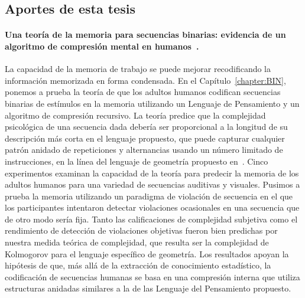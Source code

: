 \subsection{Aportes de esta tesis}

\paragraph{Una teoría de la memoria para secuencias binarias: evidencia de un algoritmo de compresión mental en humanos~\cite{planton2021memory}.} 
La capacidad de la memoria de trabajo se puede mejorar recodificando la información memorizada en forma condensada. En el Capítulo~\ref{chapter:BIN}, ponemos a prueba la teoría de que los adultos humanos codifican secuencias binarias de estímulos en la memoria utilizando un Lenguaje de Pensamiento y un algoritmo de compresión recursivo. La teoría predice que la complejidad psicológica de una secuencia dada debería ser proporcional a la longitud de su descripción más corta en el lenguaje propuesto, que puede capturar cualquier patrón anidado de repeticiones y alternancias usando un número limitado de instrucciones, en la línea del lenguaje de geometría propuesto en~\cite{amalric2017language}. Cinco experimentos examinan la capacidad de la teoría para predecir la memoria de los adultos humanos para una variedad de secuencias auditivas y visuales. Pusimos a prueba la memoria utilizando un paradigma de violación de secuencia en el que los participantes intentaron detectar violaciones ocasionales en una secuencia que de otro modo sería fija. Tanto las calificaciones de complejidad subjetiva como el rendimiento de detección de violaciones objetivas fueron bien predichas por nuestra medida teórica de complejidad, que resulta ser la complejidad de Kolmogorov para el lenguaje específico de geometría. Los resultados apoyan la hipótesis de que, más allá de la extracción de conocimiento estadístico, la codificación de secuencias humanas se basa en una compresión interna que utiliza estructuras anidadas similares a la de las Lenguaje del Pensamiento propuesto.


